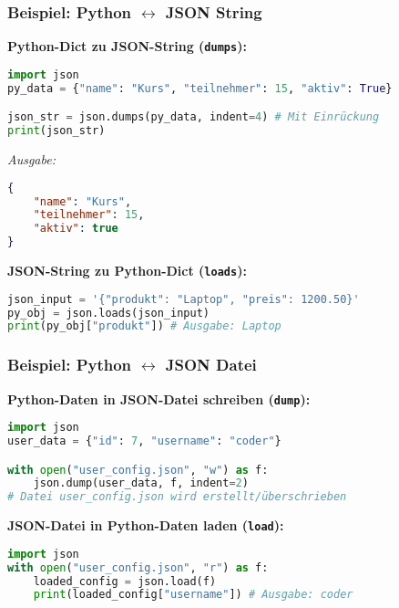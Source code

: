 \documentclass[aspectratio=169]{beamer} %
\begin{document}
\begin{frame}[fragile]
\frametitle{Beispiel: Python $\leftrightarrow$ JSON String}
\textbf{Python-Dict zu JSON-String (\texttt{dumps}):}
\begin{lstlisting}[language=Python]
import json
py_data = {"name": "Kurs", "teilnehmer": 15, "aktiv": True}

json_str = json.dumps(py_data, indent=4) # Mit Einrückung
print(json_str)
\end{lstlisting}
\textit{Ausgabe:}
\begin{lstlisting}[language=json, basicstyle=\ttfamily\tiny]
{
    "name": "Kurs",
    "teilnehmer": 15,
    "aktiv": true
}
\end{lstlisting}
\vspace{1em}
\textbf{JSON-String zu Python-Dict (\texttt{loads}):}
\begin{lstlisting}[language=Python]
json_input = '{"produkt": "Laptop", "preis": 1200.50}'
py_obj = json.loads(json_input)
print(py_obj["produkt"]) # Ausgabe: Laptop
\end{lstlisting}
\end{frame}

\begin{frame}[fragile]
\frametitle{Beispiel: Python $\leftrightarrow$ JSON Datei}
\textbf{Python-Daten in JSON-Datei schreiben (\texttt{dump}):}
\begin{lstlisting}[language=Python]
import json
user_data = {"id": 7, "username": "coder"}

with open("user_config.json", "w") as f:
    json.dump(user_data, f, indent=2)
# Datei user_config.json wird erstellt/überschrieben
\end{lstlisting}
\vspace{1em}
\textbf{JSON-Datei in Python-Daten laden (\texttt{load}):}
\begin{lstlisting}[language=Python]
import json
with open("user_config.json", "r") as f:
    loaded_config = json.load(f)
    print(loaded_config["username"]) # Ausgabe: coder
\end{lstlisting}
\end{frame}
\end{document}
